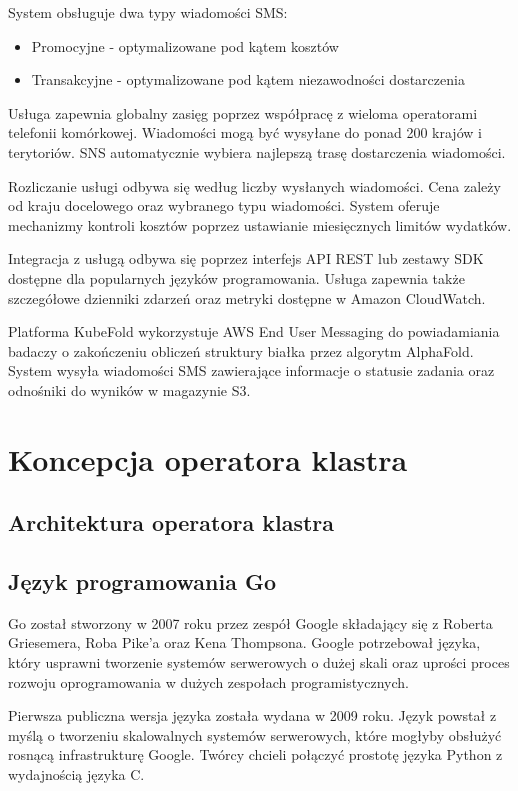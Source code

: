 System obsługuje dwa typy wiadomości SMS:
\begin{itemize}
    \item Promocyjne - optymalizowane pod kątem kosztów
    \item Transakcyjne - optymalizowane pod kątem niezawodności dostarczenia
\end{itemize}

Usługa zapewnia globalny zasięg poprzez współpracę z wieloma operatorami telefonii komórkowej.
Wiadomości mogą być wysyłane do ponad 200 krajów i terytoriów.
SNS automatycznie wybiera najlepszą trasę dostarczenia wiadomości.

Rozliczanie usługi odbywa się według liczby wysłanych wiadomości.
Cena zależy od kraju docelowego oraz wybranego typu wiadomości.
System oferuje mechanizmy kontroli kosztów poprzez ustawianie miesięcznych limitów wydatków.

Integracja z usługą odbywa się poprzez interfejs API REST lub zestawy SDK dostępne dla popularnych języków programowania.
Usługa zapewnia także szczegółowe dzienniki zdarzeń oraz metryki dostępne w Amazon CloudWatch.

Platforma KubeFold wykorzystuje AWS End User Messaging do powiadamiania badaczy o zakończeniu obliczeń struktury białka przez algorytm AlphaFold.
System wysyła wiadomości SMS zawierające informacje o statusie zadania oraz odnośniki do wyników w magazynie S3.

\section{Koncepcja operatora klastra}

\subsection{Architektura operatora klastra}

\subsection{Język programowania Go}

Go został stworzony w 2007 roku przez zespół Google składający się z Roberta Griesemera, Roba Pike'a oraz Kena Thompsona.
Google potrzebował języka, który usprawni tworzenie systemów serwerowych o dużej skali oraz uprości proces rozwoju oprogramowania w dużych zespołach programistycznych.

Pierwsza publiczna wersja języka została wydana w 2009 roku.
Język powstał z myślą o tworzeniu skalowalnych systemów serwerowych, które mogłyby obsłużyć rosnącą infrastrukturę Google.
Twórcy chcieli połączyć prostotę języka Python z wydajnością języka C.

